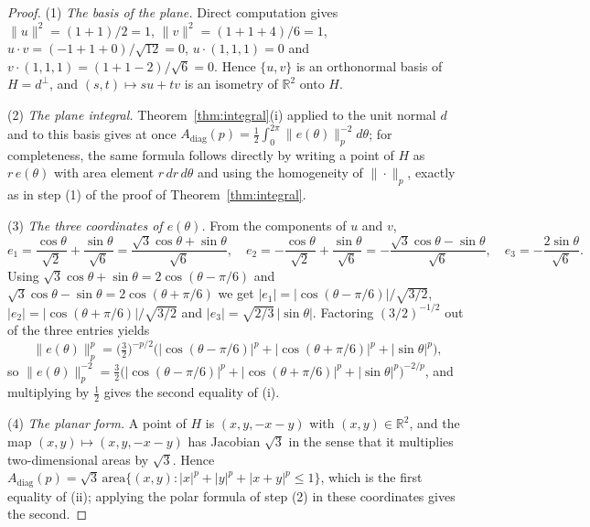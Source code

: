 \documentclass[11pt]{article}
\theoremstyle{plain}
\numberwithin{theorem}{section}
\begin{document}
\begin{proof}
(1) \emph{The basis of the plane.} Direct computation gives $\|u\|^2=(1+1)/2=1$, $\|v\|^2=(1+1+4)/6=1$, $u\cdot v=(-1+1+0)/\sqrt{12}=0$, $u\cdot(1,1,1)=0$ and $v\cdot(1,1,1)=(1+1-2)/\sqrt6=0$. Hence $\{u,v\}$ is an orthonormal basis of $H=d^{\perp}$, and $(s,t)\mapsto su+tv$ is an isometry of $\mathbb{R}^2$ onto $H$.

(2) \emph{The plane integral.} Theorem~\ref{thm:integral}(i) applied to the unit normal $d$ and to this basis gives at once $A_{\mathrm{diag}}(p)=\frac12\int_0^{2\pi}\|e(\theta)\|_p^{-2}d\theta$; for completeness, the same formula follows directly by writing a point of $H$ as $r\,e(\theta)$ with area element $r\,dr\,d\theta$ and using the homogeneity of $\|\cdot\|_p$, exactly as in step (1) of the proof of Theorem~\ref{thm:integral}.

(3) \emph{The three coordinates of $e(\theta)$.} From the components of $u$ and $v$,
\[
e_1=\frac{\cos\theta}{\sqrt2}+\frac{\sin\theta}{\sqrt6}=\frac{\sqrt3\cos\theta+\sin\theta}{\sqrt6},\quad
e_2=-\frac{\cos\theta}{\sqrt2}+\frac{\sin\theta}{\sqrt6}=-\frac{\sqrt3\cos\theta-\sin\theta}{\sqrt6},\quad
e_3=-\frac{2\sin\theta}{\sqrt6}.
\]
Using $\sqrt3\cos\theta+\sin\theta=2\cos(\theta-\pi/6)$ and $\sqrt3\cos\theta-\sin\theta=2\cos(\theta+\pi/6)$ we get $|e_1|=|\cos(\theta-\pi/6)|/\sqrt{3/2}$, $|e_2|=|\cos(\theta+\pi/6)|/\sqrt{3/2}$ and $|e_3|=\sqrt{2/3}\,|\sin\theta|$. Factoring $(3/2)^{-1/2}$ out of the three entries yields
\[
\|e(\theta)\|_p^p=\Big(\tfrac32\Big)^{-p/2}\big(|\cos(\theta-\pi/6)|^p+|\cos(\theta+\pi/6)|^p+|\sin\theta|^p\big),
\]
so $\|e(\theta)\|_p^{-2}=\tfrac32\big(|\cos(\theta-\pi/6)|^p+|\cos(\theta+\pi/6)|^p+|\sin\theta|^p\big)^{-2/p}$, and multiplying by $\frac12$ gives the second equality of (i).

(4) \emph{The planar form.} A point of $H$ is $(x,y,-x-y)$ with $(x,y)\in\mathbb{R}^2$, and the map $(x,y)\mapsto(x,y,-x-y)$ has Jacobian $\sqrt3$ in the sense that it multiplies two-dimensional areas by $\sqrt3$. Hence $A_{\mathrm{diag}}(p)=\sqrt3\,\mathrm{area}\{(x,y):|x|^p+|y|^p+|x+y|^p\le1\}$, which is the first equality of (ii); applying the polar formula of step (2) in these coordinates gives the second.


\end{proof}
\end{document}
